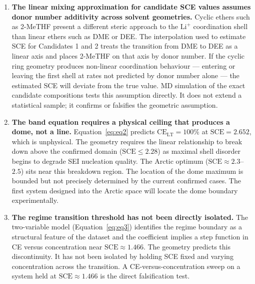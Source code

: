 \documentclass[12pt,letterpaper]{article}
\newcommand{\mSCE}{\mathrm{SCE}}
\newcommand{\mCELT}{\mathrm{CE}_{\mathrm{LT}}}
\begin{document}
\begin{enumerate}

  \item \textbf{The linear mixing approximation for
        candidate SCE values assumes donor number
        additivity across solvent geometries.}
        Cyclic ethers such as 2-MeTHF present a
        different steric approach to the
        $\mathrm{Li}^{+}$ coordination shell than
        linear ethers such as DME or DEE.
        The interpolation used to estimate SCE for
        Candidates 1 and 2 treats the transition from
        DME to DEE as a linear axis and places 2-MeTHF
        on that axis by donor number.
        If the cyclic ring geometry produces
        non-linear coordination behaviour --- entering
        or leaving the first shell at rates not
        predicted by donor number alone --- the
        estimated SCE will deviate from the true value.
        MD simulation of the exact candidate
        compositions tests this assumption directly.
        It does not extend a statistical sample;
        it confirms or falsifies the geometric
        assumption.

  \item \textbf{The band equation requires a physical
        ceiling that produces a dome, not a line.}
        Equation~\ref{eq:eq2} predicts
        $\mCELT = 100\%$ at $\mSCE = 2.652$,
        which is unphysical.
        The geometry requires the linear relationship
        to break down above the confirmed domain
        ($\mSCE \leq 2.28$) as maximal shell disorder
        begins to degrade SEI nucleation quality.
        The Arctic optimum ($\mSCE \approx 2.3$--$2.5$)
        sits near this breakdown region.
        The location of the dome maximum is bounded
        but not precisely determined by the current
        confirmed cases.
        The first system designed into the Arctic
        space will locate the dome boundary
        experimentally.

  \item \textbf{The regime transition threshold has
        not been directly isolated.}
        The two-variable model (Equation~\ref{eq:eq3})
        identifies the regime boundary as a structural
        feature of the dataset and the coefficient
        implies a step function in CE versus
        concentration near $\mSCE \approx 1.466$.
        The geometry predicts this discontinuity.
        It has not been isolated by holding SCE fixed
        and varying concentration across the
        transition.
        A CE-versus-concentration sweep on a system
        held at $\mSCE \approx 1.466$ is the direct
        falsification test.


\end{enumerate}
\end{document}
